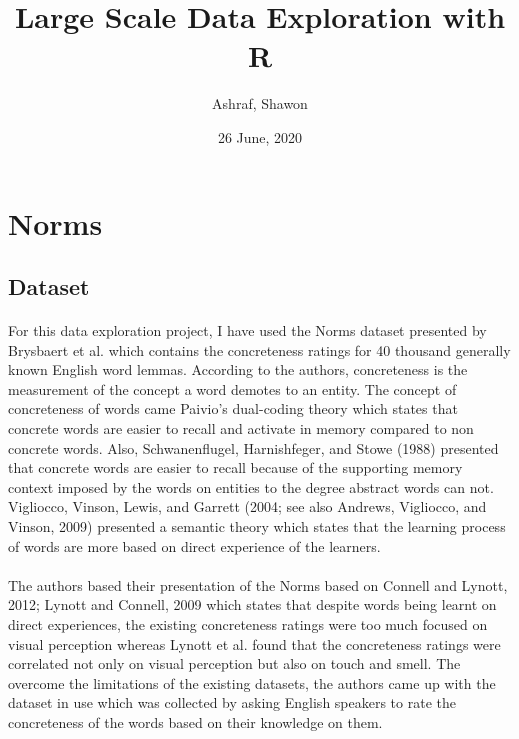 \documentclass[11pt,a4paper]{article}
\begin{document}
\title{Large Scale Data Exploration with R}
\author{Ashraf, Shawon}
\date{26 June, 2020}

\maketitle


\section{Norms}

\subsection{Dataset}

\paragraph{}
For this data exploration project, I have used the Norms dataset presented by Brysbaert et al. \cite{brys:1} which contains the concreteness ratings for 40 thousand generally known English word lemmas. According to the authors, concreteness is the measurement of the concept a word demotes to an entity. The concept of concreteness of words came Paivio’s dual-coding theory \cite{paivio:2} which states that concrete words are easier to recall and activate in memory compared to non concrete words. Also,  Schwanenflugel, Harnishfeger, and Stowe (1988) presented that concrete words are easier to recall because of the supporting memory context imposed by the words on entities to the degree abstract words can not. Vigliocco, Vinson, Lewis, and Garrett (2004; see also Andrews, Vigliocco, and Vinson, 2009) presented a semantic theory which states that the learning process of words are more based on direct experience of the learners.

\paragraph{}
The authors based their presentation of the Norms based on Connell and Lynott, 2012; Lynott and Connell, 2009 which states that despite words being learnt on direct experiences, the existing concreteness ratings were too much focused on visual perception whereas Lynott et al. found that the concreteness ratings were correlated not only on visual perception but also on touch and smell. The overcome the limitations of the existing datasets, the authors came up with the dataset in use which was collected by asking English speakers to rate the concreteness of the words based on their knowledge on them.
\end{document}
